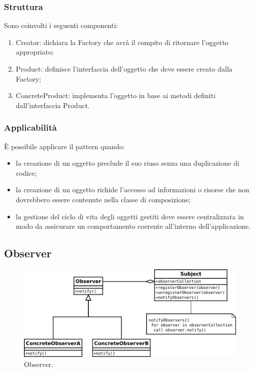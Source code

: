 \subsubsection{Struttura} Sono coinvolti i seguenti componenti:
\begin{enumerate}
	\item Creator: dichiara la Factory che avrà il compito di ritornare l'oggetto appropriato;
	\item Product: definisce l'interfaccia dell'oggetto che deve essere creato dalla Factory;
	\item ConcreteProduct: implementa l'oggetto in base ai metodi  definiti dall'interfaccia Product.
\end{enumerate}

\subsubsection{Applicabilità} È possibile applicare il pattern quando:
\begin{itemize}
	\item la creazione di un oggetto preclude il suo riuso senza una duplicazione di codice;
	\item la creazione di un oggetto richide l'accesso ad informazioni o risorse che non dovrebbero essere contenute nella classe di composizione;
	\item la gestione del ciclo di vita degli oggetti gestiti deve essere centralizzata in modo da assicurare un comportamento coerente all'interno dell'applicazione.
\end{itemize}

\subsection{Observer}

\begin{figure}[H] \label{fig:observer}
	\includegraphics[scale=0.6]{img/observer.png}
	\caption{Observer.}
\end{figure}

